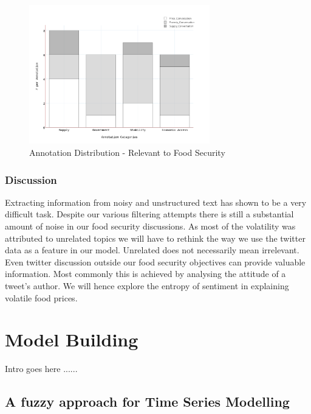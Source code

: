 \begin{figure}[H]
        \centering
         \includegraphics[width=0.7\textwidth ]{img/anal/annotation_dist}
              
        \caption{Annotation Distribution - Relevant to Food Security}
        \label{fig:annotation_dist}
\end{figure}


\subsection{Discussion}

Extracting information from noisy and unstructured text has shown to be a very difficult task. Despite our various filtering attempts there is still a substantial amount of noise in our food security discussions. As most of the volatility was attributed to unrelated topics we will have to rethink the way we use the twitter data as a feature in our model. Unrelated does not necessarily mean irrelevant. Even twitter discussion outside our food security objectives can provide valuable information. Most commonly this is achieved by analysing the attitude of a tweet's author. We will hence explore the entropy of sentiment in explaining volatile food prices. 




\chapter {Model Building}
\label{model}

Intro goes here ......

\section{A fuzzy approach for Time Series Modelling}

